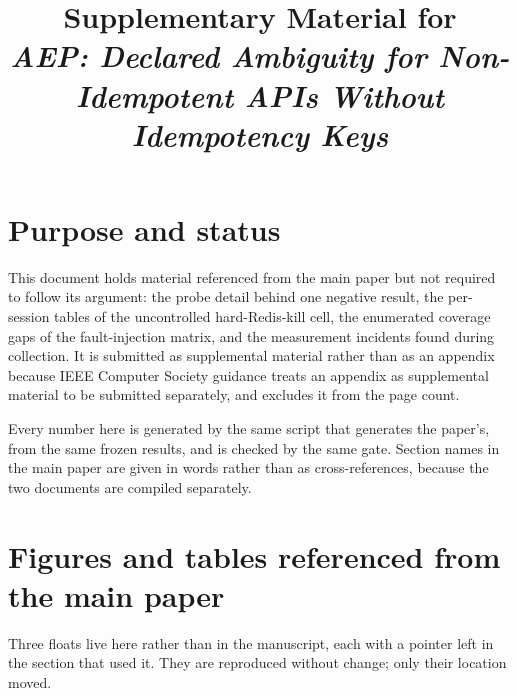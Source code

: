 \documentclass[10pt,journal,compsoc]{IEEEtran}
\newif\ifanonymous
\begin{document}
\title{Supplementary Material for\\
\emph{AEP: Declared Ambiguity for Non-Idempotent APIs Without
Idempotency Keys}}

\ifanonymous
  \author{Anonymous Author(s)}
  \hypersetup{pdfauthor={},pdftitle={},pdfsubject={},pdfkeywords={},
              pdfcreator={},pdfproducer={}}
\else
  \author{}
\fi

\maketitle

\section{Purpose and status}

This document holds material referenced from the main paper but not required to
follow its argument: the probe detail behind one negative result, the
per-session tables of the uncontrolled hard-Redis-kill cell, the enumerated
coverage gaps of the fault-injection matrix, and the measurement incidents found
during collection. It is submitted as supplemental material rather than as an
appendix because IEEE Computer Society guidance treats an appendix as
supplemental material to be submitted separately, and excludes it from the page
count.

Every number here is generated by the same script that generates the paper's,
from the same frozen results, and is checked by the same gate. Section names in
the main paper are given in words rather than as cross-references, because the
two documents are compiled separately.

\section{Figures and tables referenced from the main paper}
\label{supp:floats}

Three floats live here rather than in the manuscript, each with a pointer left
in the section that used it. They are reproduced without change; only their
location moved.
\end{document}

